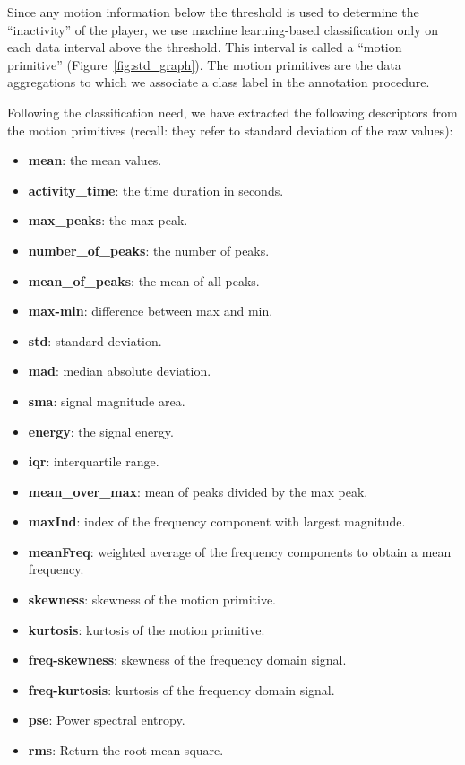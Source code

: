 Since any motion information below the threshold is used to determine the ``inactivity'' of the player, we use machine learning-based classification only on each data interval above the threshold. This interval is called a ``motion primitive'' (Figure~\ref{fig:std_graph}). The motion primitives are the data aggregations to which we associate a class label in the annotation procedure. 

Following the classification need, we have extracted the following descriptors from the motion primitives (recall: they refer to standard deviation of the raw values): 

\begin{itemize}
\item \textbf{mean}:  the mean values.
\item \textbf{activity\_time}: the time duration in seconds.
\item \textbf{max\_peaks}:  the max peak.
\item \textbf{number\_of\_peaks}:  the number of peaks.
\item \textbf{mean\_of\_peaks}: the mean of all peaks.
\item \textbf{max-min}: difference between max and min.
\item \textbf{std}: standard deviation.
\item \textbf{mad}: median absolute deviation.
\item \textbf{sma}: signal magnitude area.
\item \textbf{energy}: the signal energy.
\item \textbf{iqr}: interquartile range.
\item \textbf{mean\_over\_max}: mean of peaks divided by the max peak.
\item \textbf{maxInd}: index of the frequency component with largest magnitude.
\item \textbf{meanFreq}:  weighted average of the frequency components to obtain a mean frequency.
\item \textbf{skewness}:  skewness of the motion primitive.
\item \textbf{kurtosis}:  kurtosis of the motion primitive.
\item \textbf{freq-skewness}: skewness of the frequency domain signal.
\item \textbf{freq-kurtosis}: kurtosis of the frequency domain signal.
\item \textbf{pse}: Power spectral entropy.
\item \textbf{rms}: Return the root mean square.
\end{itemize}

